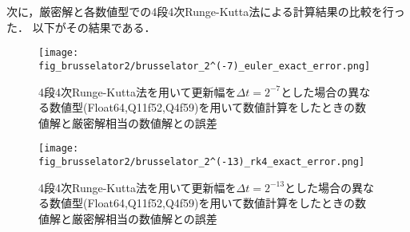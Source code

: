 次に，厳密解と各数値型での4段4次Runge-Kutta法による計算結果の比較を行った．
以下がその結果である．\\
\begin{figure}[H]
    \centering
    \begin{minipage}[b]{0.49\columnwidth}
        \centering
        \texttt{[image: fig\_brusselator2/brusselator\_2^(-7)\_euler\_exact\_error.png]}
        \caption{4段4次Runge-Kutta法を用いて更新幅を$\Delta t = 2^{-7}$とした場合の異なる数値型(Float64,Q11f52,Q4f59)を用いて数値計算をしたときの数値解と厳密解相当の数値解との誤差}
        \label{fig:brusselator_2^(-7)_rk4_exact_error}
    \end{minipage}
    \begin{minipage}[b]{0.49\columnwidth}
        \centering
        \texttt{[image: fig\_brusselator2/brusselator\_2^(-13)\_rk4\_exact\_error.png]}
        \caption{4段4次Runge-Kutta法を用いて更新幅を$\Delta t =  2^{-13}$とした場合の異なる数値型(Float64,Q11f52,Q4f59)を用いて数値計算をしたときの数値解と厳密解相当の数値解との誤差}
        \label{fig:brusselator_2^(-13)_rk4_exact_error}
    \end{minipage}
\end{figure}


